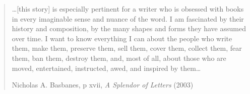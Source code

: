 

\mainmatter

\begin{quote}

\ldots [this story] is especially pertinent for a writer who is
obsessed with books in every imaginable sense and nuance of the
word. I am fascinated by their history and composition, by the many
shapes and forms they have assumed over time. I want to know
everything I can about the people who write them, make them, preserve
them, sell them, cover them, collect them, fear them, ban them,
destroy them, and, most of all, about those who are moved,
entertained, instructed, awed, and inspired by them\ldots

         Nicholas A. Basbanes, p xvii, {\it A Splendor of Letters} (2003)\cite{basbanes:2003}
\end{quote}


\backmatter





